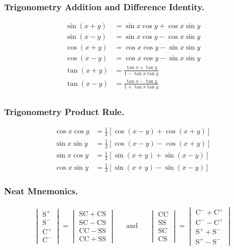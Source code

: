 \documentclass[../main.tex]{subfiles}
\begin{document}
\subsubsection*{Trigonometry Addition and Difference Identity.}
\begin{align*}
    \sin(x+y)&=\sin x \cos y+ \cos x \sin y\\
    \sin(x-y)&=\sin x \cos y- \cos x \sin y\\
    \cos(x+y)&=\cos x \cos y- \sin x \sin y\\
    \cos(x-y)&=\cos x \cos y- \sin x \sin y\\
    \tan (x+y)&=\frac{\tan x+\tan y}{1-\tan x\tan y}\\
    \tan (x-y)&=\frac{\tan x-\tan y}{1+\tan x\tan y}\\
\end{align*}

\subsubsection*{Trigonometry Product Rule.}
\begin{align*}
    \cos x \cos y&= \frac{1}{2}[\cos(x-y)+\cos(x+y)]\\
    \sin x \sin y&= \frac{1}{2}[\cos(x-y)-\cos(x+y)]\\
    \sin x \cos y&= \frac{1}{2}[\sin(x+y)+\sin(x-y)]\\
    \cos x \sin y&= \frac{1}{2}[\sin(x+y)-\sin(x-y)]
\end{align*}

\subsubsection*{Neat Mnemonics.}
\begin{align*}
    \begin{vmatrix}
        \mathrm{S^+}\\
        \mathrm{S^-}\\
        \mathrm{C^+}\\
        \mathrm{C^-}
    \end{vmatrix}=
    \begin{vmatrix}
        \mathrm{SC+CS}\\
        \mathrm{SC-CS}\\
        \mathrm{CC-SS}\\
        \mathrm{CC+SS}
    \end{vmatrix}
    &&\mathrm{and}&&
    \begin{vmatrix}
        \mathrm{CC}\\
        \mathrm{SS}\\
        \mathrm{SC}\\
        \mathrm{CS}
    \end{vmatrix}=
    \begin{vmatrix}
        \mathrm{C^-+C^+}\\
        \mathrm{C^--C^+}\\
        \mathrm{S^++S^-}\\
        \mathrm{S^+-S^-}
    \end{vmatrix}
\end{align*}
\end{document}
